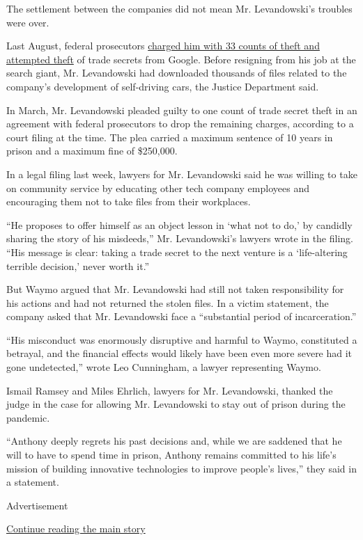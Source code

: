 The settlement between the companies did not mean Mr. Levandowski's
troubles were over.

Last August, federal prosecutors
\href{https://www.nytimes3xbfgragh.onion/2019/08/27/technology/google-trade-secrets-levandowski.html}{charged
him with 33 counts of theft and attempted theft} of trade secrets from
Google. Before resigning from his job at the search giant, Mr.
Levandowski had downloaded thousands of files related to the company's
development of self-driving cars, the Justice Department said.

In March, Mr. Levandowski pleaded guilty to one count of trade secret
theft in an agreement with federal prosecutors to drop the remaining
charges, according to a court filing at the time. The plea carried a
maximum sentence of 10 years in prison and a maximum fine of \$250,000.

In a legal filing last week, lawyers for Mr. Levandowski said he was
willing to take on community service by educating other tech company
employees and encouraging them not to take files from their workplaces.

``He proposes to offer himself as an object lesson in `what not to do,'
by candidly sharing the story of his misdeeds,'' Mr. Levandowski's
lawyers wrote in the filing. ``His message is clear: taking a trade
secret to the next venture is a `life-altering terrible decision,' never
worth it.''

But Waymo argued that Mr. Levandowski had still not taken responsibility
for his actions and had not returned the stolen files. In a victim
statement, the company asked that Mr. Levandowski face a ``substantial
period of incarceration.''

``His misconduct was enormously disruptive and harmful to Waymo,
constituted a betrayal, and the financial effects would likely have been
even more severe had it gone undetected,'' wrote Leo Cunningham, a
lawyer representing Waymo.

Ismail Ramsey and Miles Ehrlich, lawyers for Mr. Levandowski, thanked
the judge in the case for allowing Mr. Levandowski to stay out of prison
during the pandemic.

``Anthony deeply regrets his past decisions and, while we are saddened
that he will to have to spend time in prison, Anthony remains committed
to his life's mission of building innovative technologies to improve
people's lives,'' they said in a statement.

Advertisement

\protect\hyperlink{after-bottom}{Continue reading the main story}

